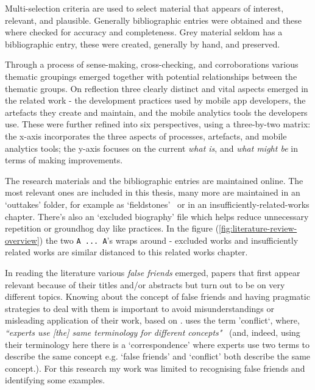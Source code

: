 Multi-selection criteria are used to select material that appears of interest, relevant, and plausible. Generally bibliographic entries were obtained and these where checked for accuracy and completeness. Grey material seldom has a bibliographic entry, these were created, generally by hand, and preserved.

Through a process of sense-making, cross-checking, and corroborations various thematic groupings emerged together with potential relationships between the thematic groups. On reflection three clearly distinct and vital aspects emerged in the related work - the development practices used by mobile app developers, the artefacts they create and maintain, and the mobile analytics tools the developers use. These were further refined into six perspectives, using a three-by-two matrix: the x-axis incorporates the three aspects of processes, artefacts, and mobile analytics tools; the y-axis focuses on the current \emph{what is}, and \emph{what might be} in terms of making improvements.

The research materials and the bibliographic entries are maintained online. The most relevant ones are included in this thesis, many more are maintained in an `outtakes' folder, for example as `fieldstones'~\citep{weinberg2006weinberg} or in an insufficiently-related-works chapter. There's also an `excluded biography' file which helps reduce unnecessary repetition or groundhog day like practices. In the figure (\ref{fig:literature-review-overview}) the two \texttt{A ... A}'s wraps around - excluded works and insufficiently related works are similar distanced to this related works chapter.

In reading the literature various \textit{false friends} emerged, papers that first appear relevant because of their titles and/or abstracts but turn out to be on very different topics. Knowing about the concept of false friends and having pragmatic strategies to deal with them is important to avoid misunderstandings or misleading application of their work, based on \citep[p. 1833]{ChamizoDominguez2002_false_friends_their_origins_and_semantics_in_some_languages}. \citet{shaw1989_comparing_conceptual_structures__consensus_conflict_correspondence_and_contrast} uses the term 'conflict`, where, \emph{``experts use [the] same terminology for different concepts"}~\citep[p. 3]{shaw1989_comparing_conceptual_structures__consensus_conflict_correspondence_and_contrast} (and, indeed, using their terminology here there is a `correspondence' where experts use two terms to describe the same concept e.g. `false friends' and `conflict' both describe the same concept.). For this research my work was limited to recognising false friends and identifying some examples. 

